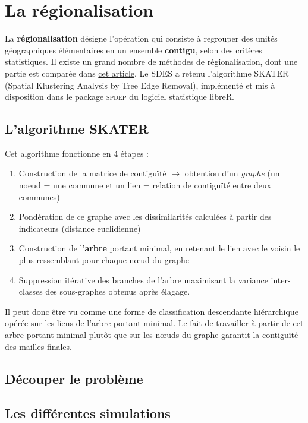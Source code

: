 \documentclass[12pt, a4paper]{article}
\begin{document}
\section{La régionalisation}

La \textbf{régionalisation} désigne l'opération qui consiste à regrouper des unités géographiques élémentaires en un ensemble \textbf{contigu}, selon des critères statistiques. Il existe un grand nombre de méthodes de régionalisation, dont une partie est comparée dans \href{http://journals.sagepub.com/doi/pdf/10.1177/0160017607301605}{cet article}. Le SDES a retenu l'algorithme SKATER (Spatial Klustering Analysis by Tree Edge Removal), implémenté et mis à disposition dans le package \textsc{spdep} du logiciel statistique libre\textsc{R}.

\subsection{L'algorithme SKATER}

Cet algorithme fonctionne en 4 étapes :

\begin{enumerate}
\item Construction de la matrice de contiguïté $\rightarrow$ obtention d'un \emph{graphe} (un noeud = une commune et un lien = relation de contiguïté entre deux communes)
\item Pondération de ce graphe avec les dissimilarités calculées à partir des indicateurs (distance euclidienne)
\item Construction de l'\textbf{arbre} portant minimal, en retenant le lien avec le voisin le plus ressemblant pour chaque n\oe ud du graphe
\item Suppression itérative des branches de l'arbre maximisant la variance inter-classes des sous-graphes obtenus après élagage.
\end{enumerate}

Il peut donc être vu comme une forme de classification descendante hiérarchique opérée sur les liens de l'arbre portant minimal. Le fait de travailler à partir de cet arbre portant minimal plutôt que sur les n\oe uds du graphe garantit la contiguïté des mailles finales.

\subsection{Découper le problème}

\subsection{Les différentes simulations}
\end{document}
